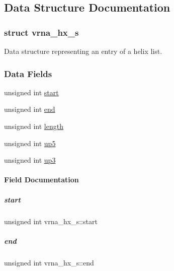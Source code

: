\subsection{Data Structure Documentation}
\label{structvrna__hx__s}
\subsubsection{struct vrna\+\_\+hx\+\_\+s}
Data structure representing an entry of a helix list. \subsubsection*{Data Fields}
\begin{DoxyCompactItemize}
\item 
unsigned int \mbox{\hyperlink{group__struct__utils_ac9b1c418fb5426f8fb2562681a60d56c}{start}}
\item 
unsigned int \mbox{\hyperlink{group__struct__utils_a05b855a6c2b277f26f0282bc13c1e6e0}{end}}
\item 
unsigned int \mbox{\hyperlink{group__struct__utils_a9184affd5dc5043f195e5c274c8e857f}{length}}
\item 
unsigned int \mbox{\hyperlink{group__struct__utils_a51a6a945dbc7f9443fb19a1af8126bb7}{up5}}
\item 
unsigned int \mbox{\hyperlink{group__struct__utils_ac2c0832c332d750ff1c87f63a01760bd}{up3}}
\end{DoxyCompactItemize}


\paragraph{Field Documentation}
\mbox{\label{group__struct__utils_ac9b1c418fb5426f8fb2562681a60d56c}} 
\subparagraph{\texorpdfstring{start}{start}}
{\footnotesize\ttfamily unsigned int vrna\+\_\+hx\+\_\+s\+::start}

\mbox{\label{group__struct__utils_a05b855a6c2b277f26f0282bc13c1e6e0}} 
\subparagraph{\texorpdfstring{end}{end}}
{\footnotesize\ttfamily unsigned int vrna\+\_\+hx\+\_\+s\+::end}

